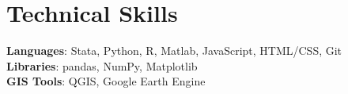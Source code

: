 \documentclass[letterpaper,11pt]{article}
\begin{document}
%
\section{Technical Skills}
 \begin{itemize}[leftmargin=0.15in, label={}]
    \small{\item{
     \textbf{Languages}{: Stata, Python, R, Matlab, JavaScript, HTML/CSS, Git} \\
     \textbf{Libraries}{: pandas, NumPy, Matplotlib} \\
     \textbf{GIS Tools}{: QGIS, Google Earth Engine} \\
    }}
 \end{itemize}


\end{document}

